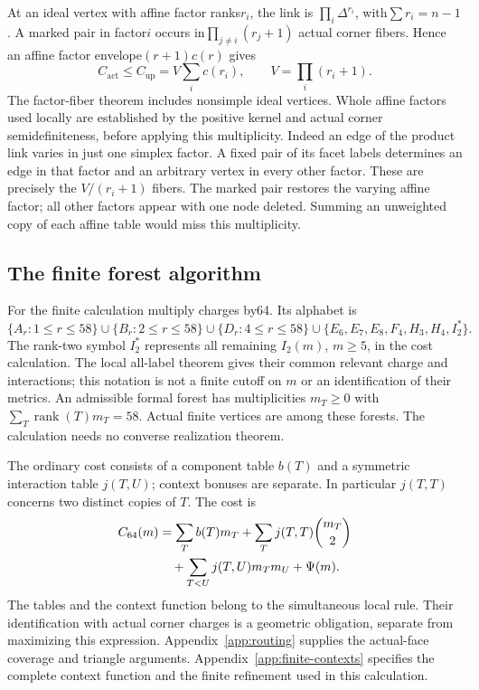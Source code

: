 \documentclass[11pt]{article}
\theoremstyle{remark}\newtheorem{remark}[theorem]{Remark}
\newcommand{\act}{\mathrm{act}}
\newcommand{\up}{\mathrm{up}}
\begin{document}
At an ideal vertex with affine factor ranks$r_i$, the link is
$\prod_i\Delta^{r_i}$, with$\sum r_i=n-1$. A marked pair in factor$i$
occurs in$\prod_{j\ne i}(r_j+1)$ actual corner fibers. Hence an affine
factor envelope$(r+1)c(r)$ gives
\begin{equation}\label{eq:envelope}
 C_{\act}\le C_{\up}=V\sum_i c(r_i),\qquad V=\prod_i(r_i+1).
\end{equation}
The factor-fiber theorem includes nonsimple ideal vertices. Whole affine
factors used locally are established by the positive kernel and actual
corner semidefiniteness, before applying this multiplicity.
Indeed an edge of the product link varies in just one simplex factor.
A fixed pair of its facet labels determines an edge in that factor
and an arbitrary vertex in every other factor. These are precisely
the $V/(r_i+1)$ fibers. The marked pair restores the varying affine
factor; all other factors appear with one node deleted. Summing an
unweighted copy of each affine table would miss this multiplicity.

\subsection{The finite forest algorithm}

For the finite calculation multiply charges by64. Its alphabet is
\[
 \{A_r:1\le r\le58\}\cup\{B_r:2\le r\le58\}
 \cup\{D_r:4\le r\le58\}
 \cup\{E_6,E_7,E_8,F_4,H_3,H_4,I_2^*\}.
\]
The rank-two symbol $I_2^*$ represents all remaining $I_2(m)$,
$m\ge5$, in the cost calculation. The local all-label theorem
gives their common relevant charge and interactions; this notation
is not a finite cutoff on $m$ or an identification of their metrics.
An admissible formal forest has multiplicities $m_T\ge0$ with
$\sum_T\operatorname{rank}(T)m_T=58$. Actual finite vertices are
among these forests. The calculation needs no converse realization
theorem.

The ordinary cost consists of a component table $b(T)$ and a
symmetric interaction table $j(T,U)$; context bonuses are separate.
In particular $j(T,T)$ concerns two distinct copies of $T$.
The cost is
\begin{align}\label{eq:forest-cost}
 C_{64}(m)&=\sum_T b(T)m_T+\sum_T j(T,T)\binom{m_T}{2}\notag\\
 &\quad+\sum_{T<U}j(T,U)m_Tm_U+\Psi(m).
\end{align}
The tables and the context function belong to the simultaneous
local rule. Their identification with actual corner charges is a
geometric obligation, separate from maximizing this expression.
Appendix~\ref{app:routing} supplies the actual-face coverage and
triangle arguments.
Appendix~\ref{app:finite-contexts} specifies the complete context
function and the finite refinement used in this calculation.
\end{document}
